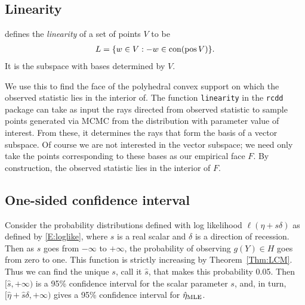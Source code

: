 \subsection{Linearity}\label{S:linearity}
\citet{Geyer:gdor} defines the \emph{linearity} of a set of points $V$ to be
\begin{align*}
	L = \{ w \in V: -w \in \operatorname{con}( \operatorname{pos} V) \}.
\end{align*}
It is the subspace with bases determined by $V$.

We use this to find the face of the polyhedral convex support on which the observed 
statistic lies in the interior of.  The function \texttt{linearity} in the \texttt
{rcdd} package can take as input the rays directed from observed statistic to sample 
points generated via MCMC from the distribution with parameter value of interest.  
From these, it determines the rays that form the basis of a vector subspace.  Of 
course we are not interested in the vector subspace; we need only take the points 
corresponding to these bases as our empirical face $F$.  By construction, the observed 
statistic lies in the interior of $F$.




\subsection{One-sided confidence interval}

Consider the probability distributions defined with log likelihood $\ell( \eta + s 
\delta)$ as defined 
by \eqref{E:loglike}, where $s$ is a real scalar and $\delta$ is a direction of 
recession.  Then 
as $s$ goes from $-\infty$ to $+\infty$, the probability of observing $g(Y) \in H$ 
goes from zero to one.  This 
function is strictly increasing by Theorem~\ref{Thm:LCM}.  Thus we can find the unique 
$s$, call it $\hat{s}$, that makes 
this probability 0.05.  Then $[\hat{s}, +\infty)$ is a 95\% confidence interval for 
the scalar parameter 
$s$, and, in turn, $[\hat{\eta} + \hat{s}\delta, +\infty)$ gives a 95\% confidence 
interval for $\hat{\eta}_{\textrm{MLE}}
$.

